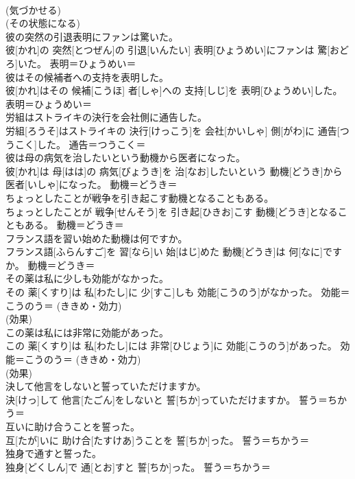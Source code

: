 \documentclass[8pt]{extreport}
\begin{document}
\begin{CJK}{UTF8}{min}
{\\	(気づかせる) 
\\	(その状態になる)
\\	彼の突然の引退表明にファンは驚いた。	
\\	彼[かれ]の 突然[とつぜん]の 引退[いんたい] 表明[ひょうめい]にファンは 驚[おどろ]いた。	表明＝ひょうめい＝ 
\\	彼はその候補者への支持を表明した。	
\\	彼[かれ]はその 候補[こうほ] 者[しゃ]への 支持[しじ]を 表明[ひょうめい]した。	表明＝ひょうめい＝ 
\\	労組はストライキの決行を会社側に通告した。	
\\	労組[ろうそ]はストライキの 決行[けっこう]を 会社[かいしゃ] 側[がわ]に 通告[つうこく]した。	通告＝つうこく＝ 
\\	彼は母の病気を治したいという動機から医者になった。	
\\	彼[かれ]は 母[はは]の 病気[びょうき]を 治[なお]したいという 動機[どうき]から 医者[いしゃ]になった。	動機＝どうき＝ 
\\	ちょっとしたことが戦争を引き起こす動機となることもある。	
\\	ちょっとしたことが 戦争[せんそう]を 引き起[ひきお]こす 動機[どうき]となることもある。	動機＝どうき＝ 
\\	フランス語を習い始めた動機は何ですか。	
\\	フランス語[ふらんすご]を 習[なら]い 始[はじ]めた 動機[どうき]は 何[なに]ですか。	動機＝どうき＝ 
\\	その薬は私に少しも効能がなかった。	
\\	その 薬[くすり]は 私[わたし]に 少[すこ]しも 効能[こうのう]がなかった。	効能＝こうのう＝ (ききめ・効力) 
\\	(効果)
\\	この薬は私には非常に効能があった。	
\\	この 薬[くすり]は 私[わたし]には 非常[ひじょう]に 効能[こうのう]があった。	効能＝こうのう＝ (ききめ・効力) 
\\	(効果)
\\	決して他言をしないと誓っていただけますか。	
\\	決[けっ]して 他言[たごん]をしないと 誓[ちか]っていただけますか。	誓う＝ちかう＝ 
\\	互いに助け合うことを誓った。	
\\	互[たが]いに 助け合[たすけあ]うことを 誓[ちか]った。	誓う＝ちかう＝ 
\\	独身で通すと誓った。	
\\	独身[どくしん]で 通[とお]すと 誓[ちか]った。	誓う＝ちかう＝ 
}
\end{CJK}
\end{document}
